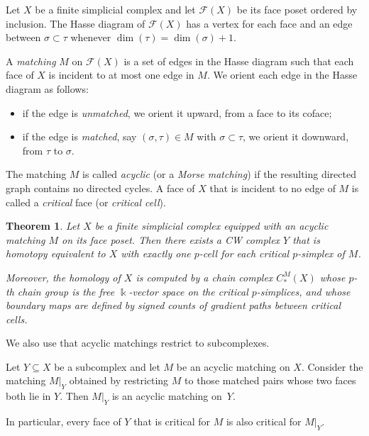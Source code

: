 \documentclass[12pt]{amsart}
\theoremstyle{plain}
\newtheorem{thm}{Theorem}[section]
\theoremstyle{definition}
\begin{document}
\begin{defn}
Let $X$ be a finite simplicial complex and let $\mathcal{F}(X)$ be its face poset ordered by
inclusion. The Hasse diagram of $\mathcal{F}(X)$ has a vertex for each face and an edge between
$\sigma\subset\tau$ whenever $\dim(\tau)=\dim(\sigma)+1$.

A \emph{matching} $M$ on $\mathcal{F}(X)$ is a set of edges in the Hasse diagram such that each face
of $X$ is incident to at most one edge in $M$. We orient each edge in the Hasse diagram as follows:
\begin{itemize}
  \item if the edge is \emph{unmatched}, we orient it upward, from a face to its coface;
  \item if the edge is \emph{matched}, say $(\sigma,\tau)\in M$ with $\sigma\subset\tau$, we orient
  it downward, from $\tau$ to $\sigma$.
\end{itemize}
The matching $M$ is called \emph{acyclic} (or a \emph{Morse matching}) if the resulting
directed graph contains no directed cycles. A face of $X$ that is incident to no edge of $M$ is
called a \emph{critical} face (or \emph{critical cell}).
\end{defn}

\begin{thm}{\cite[Theorems 7.3 and 8.2]{Forman98}}
\label{thm:forman}
Let $X$ be a finite simplicial complex equipped with an acyclic matching $M$ on its face poset.
Then there exists a CW complex $Y$ that is homotopy equivalent to $X$ with exactly one $p$-cell for
each critical $p$-simplex of $M$.

Moreover, the homology of $X$ is computed by a chain complex $C^{M}_\ast(X)$ whose $p$-th chain
group is the free $\Bbbk$-vector space on the critical $p$-simplices, and whose boundary maps are
defined by signed counts of gradient paths between critical cells.
\end{thm}

We  also use that acyclic matchings restrict to subcomplexes.

\begin{lem}
\label{lem:restriction-matching}
Let $Y\subseteq X$ be a subcomplex and let $M$ be an acyclic matching on $X$. Consider the matching
$M|_Y$ obtained by restricting $M$ to those matched pairs whose two faces both lie in $Y$. Then
$M|_Y$ is an acyclic matching on~$Y$.

In particular, every face of $Y$ that is critical for $M$ is also critical for $M|_Y$.
\end{lem}
\end{document}
